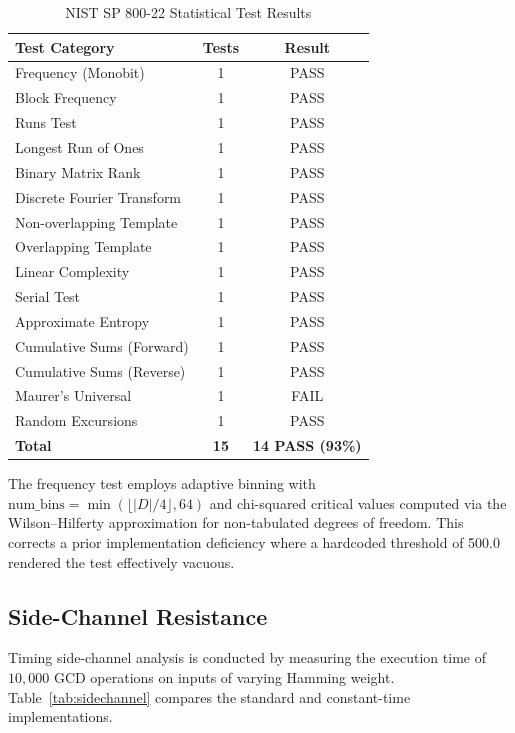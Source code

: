 \documentclass[lettersize,journal]{IEEEtran}
\begin{document}
\begin{table}[!t]
\caption{NIST SP 800-22 Statistical Test Results\label{tab:nist}}
\centering
\begin{tabular}{@{}lcc@{}}
\toprule
\textbf{Test Category} & \textbf{Tests} & \textbf{Result} \\
\midrule
Frequency (Monobit)         & 1 & PASS \\
Block Frequency             & 1 & PASS \\
Runs Test                   & 1 & PASS \\
Longest Run of Ones         & 1 & PASS \\
Binary Matrix Rank          & 1 & PASS \\
Discrete Fourier Transform  & 1 & PASS \\
Non-overlapping Template    & 1 & PASS \\
Overlapping Template        & 1 & PASS \\
Linear Complexity           & 1 & PASS \\
Serial Test                 & 1 & PASS \\
Approximate Entropy         & 1 & PASS \\
Cumulative Sums (Forward)   & 1 & PASS \\
Cumulative Sums (Reverse)   & 1 & PASS \\
Maurer's Universal          & 1 & FAIL \\
Random Excursions           & 1 & PASS \\
\midrule
\textbf{Total}              & \textbf{15} & \textbf{14 PASS (93\%)} \\
\bottomrule
\end{tabular}
\end{table}

The frequency test employs adaptive binning with $\text{num\_bins} = \min(\lfloor|D|/4\rfloor, 64)$ and chi-squared critical values computed via the Wilson--Hilferty approximation for non-tabulated degrees of freedom. This corrects a prior implementation deficiency where a hardcoded threshold of 500.0 rendered the test effectively vacuous.

\subsection{Side-Channel Resistance}

Timing side-channel analysis is conducted by measuring the execution time of $10{,}000$ GCD operations on inputs of varying Hamming weight. Table~\ref{tab:sidechannel} compares the standard and constant-time implementations.
\end{document}
